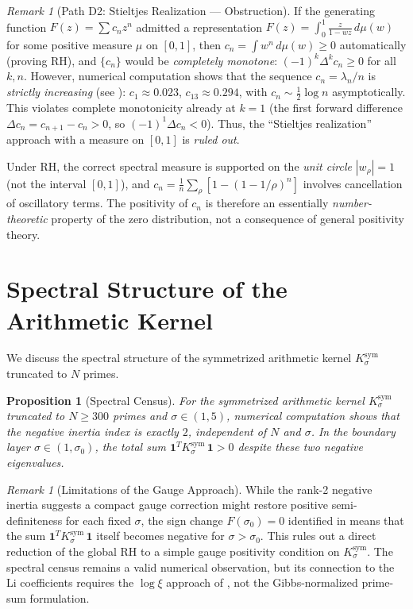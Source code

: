 \documentclass[12pt,a4paper]{article}
\newtheorem{proposition}[theorem]{Proposition}
\theoremstyle{definition}
\theoremstyle{remark}
\newtheorem{remark}[theorem]{Remark}
\newcommand{\Ksym}{K_\sigma^{\mathrm{sym}}}
\begin{document}
\begin{remark}[Path D2: Stieltjes Realization --- Obstruction]
If the generating function $F(z) = \sum c_n z^n$ admitted a representation
$F(z) = \int_0^1 \frac{z}{1-wz}\,d\mu(w)$
for some positive measure $\mu$ on $[0,1]$, then $c_n = \int w^n\,d\mu(w) \geq 0$ automatically (proving RH), and $\{c_n\}$ would be \emph{completely monotone}: $(-1)^k \Delta^k c_n \geq 0$ for all $k, n$. However, numerical computation shows that the sequence $c_n = \lambda_n/n$ is \emph{strictly increasing} (see ): $c_1 \approx 0.023$, $c_{13} \approx 0.294$, with $c_n \sim \frac{1}{2}\log n$ asymptotically. This violates complete monotonicity already at $k=1$ (the first forward difference $\Delta c_n = c_{n+1} - c_n > 0$, so $(-1)^1 \Delta c_n < 0$). Thus, the ``Stieltjes realization'' approach with a measure on $[0,1]$ is \emph{ruled out}.

Under RH, the correct spectral measure is supported on the \emph{unit circle} $|w_\rho| = 1$ (not the interval $[0,1]$), and $c_n = \frac{1}{n}\sum_\rho [1-(1-1/\rho)^n]$ involves cancellation of oscillatory terms. The positivity of $c_n$ is therefore an essentially \emph{number-theoretic} property of the zero distribution, not a consequence of general positivity theory.
\end{remark}

\section{Spectral Structure of the Arithmetic Kernel}

We discuss the spectral structure of the symmetrized arithmetic kernel $\Ksym$ truncated to $N$ primes.

\begin{proposition}[Spectral Census]\label{prop:spectral-census}
For the symmetrized arithmetic kernel $\Ksym$ truncated to $N \ge 300$ primes and $\sigma \in (1, 5)$, numerical computation shows that the negative inertia index is exactly $2$, independent of $N$ and $\sigma$. In the boundary layer $\sigma \in (1, \sigma_0)$, the total sum $\mathbf{1}^T \Ksym\, \mathbf{1} > 0$ despite these two negative eigenvalues.
\end{proposition}

\begin{remark}[Limitations of the Gauge Approach]
While the rank-2 negative inertia suggests a compact gauge correction might restore positive semi-definiteness for each fixed $\sigma$, the sign change $F(\sigma_0) = 0$ identified in  means that the sum $\mathbf{1}^T \Ksym\, \mathbf{1}$ itself becomes negative for $\sigma > \sigma_0$. This rules out a direct reduction of the global RH to a simple gauge positivity condition on $\Ksym$. The spectral census remains a valid numerical observation, but its connection to the Li coefficients requires the $\log\xi$ approach of , not the Gibbs-normalized prime-sum formulation.
\end{remark}
\end{document}
